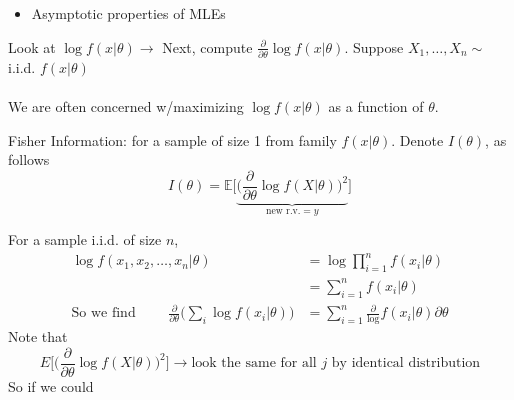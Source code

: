 \begin{itemize}
	\item Asymptotic properties of MLEs
\end{itemize}
Look at $\log f(x | \theta) \rightarrow$ Next, compute $\frac{\partial}{\partial \theta} \log f(x | \theta)$. \quad Suppose $X_1, \ldots, X_n \sim$ i.i.d. $f(x|\theta)$\\\\
We are often concerned w/maximizing $\log f(x|\theta)$ as a function of $\theta$.
\begin{definition}
	Fisher Information: for a sample of size 1 from family $f(x| \theta)$. Denote $I(\theta)$, as follows
	\begin{equation*}
		I(\theta) = \mathbb{E} \bigg[ \underbrace{\bigg( \frac{\partial}{\partial \theta} \log f(X | \theta) \bigg)^2}_{\text{new r.v.} = y} \bigg]
	\end{equation*}
\end{definition}
For a sample i.i.d. of size $n$, 
\begin{align*}
	\log f(x_1, x_2, \ldots, x_n | \theta) & = \log \prod_{i=1}^n f(x_i | \theta)\\
	& = \sum_{i=1}^n f(x_i | \theta)\\
	\text{So we find } \qquad \frac{\partial}{\partial \theta} \bigg( \sum_i \log f(x_i | \theta) \bigg) & = \sum_{i=1}^n \frac{\partial} \log f(x_i | \theta){\partial \theta}
\end{align*}
Note that
\begin{equation*}
	E \bigg[ \bigg( \frac{\partial}{\partial \theta} \log f(X | \theta) \bigg)^2 \bigg] \rightarrow \text{look the same for all $j$ by identical distribution}
\end{equation*}
So if we could 
